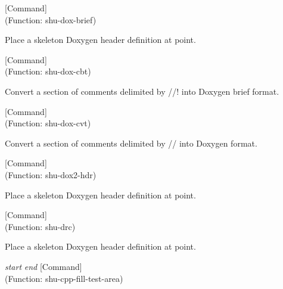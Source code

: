 \vspace{1em}
\noindent
{}
\usebox{\funcname}
 \hfill [Command]\\%
 (Function: shu-dox-brief)

\begin{doc-string}
Place a skeleton Doxygen header definition at point.
\end{doc-string}

\vspace{1em}
\noindent
{}
\usebox{\funcname}
 \hfill [Command]\\%
 (Function: shu-dox-cbt)

\begin{doc-string}
Convert a section of comments delimited by //! into Doxygen brief format.
\end{doc-string}

\vspace{1em}
\noindent
{}
\usebox{\funcname}
 \hfill [Command]\\%
 (Function: shu-dox-cvt)

\begin{doc-string}
Convert a section of comments delimited by // into Doxygen format.
\end{doc-string}

\vspace{1em}
\noindent
{}
\usebox{\funcname}
 \hfill [Command]\\%
 (Function: shu-dox2-hdr)

\begin{doc-string}
Place a skeleton Doxygen header definition at point.
\end{doc-string}

\vspace{1em}
\noindent
{}
\usebox{\funcname}
 \hfill [Command]\\%
 (Function: shu-drc)

\begin{doc-string}
Place a skeleton Doxygen header definition at point.
\end{doc-string}

\vspace{1em}
\noindent
{}
\usebox{\funcname}\emph{start} \emph{end}
 \hfill [Command]\\%
 (Function: shu-cpp-fill-test-area)

